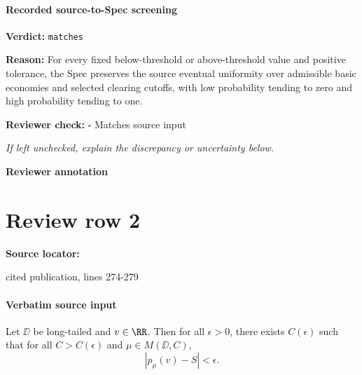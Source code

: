 \documentclass[10pt]{article}
\newcommand{\reviewerbox}{%
  \par\noindent\fbox{\parbox{0.96\linewidth}{\rule{0pt}{0.38in}}}\par
}
\newcommand{\reviewmatch}[1]{%
  \par\noindent\textbf{Reviewer check:} $\square$\; #1\par
  \noindent\emph{If left unchecked, explain the discrepancy or uncertainty below.}\par
}
\begin{document}
\paragraph{Recorded source-to-Spec screening}
\textbf{Verdict:} \texttt{matches}
\\
{\raggedright
\textbf{Reason:} For every fixed below-\allowbreak{}threshold or above-\allowbreak{}threshold value and positive tolerance, the Spec preserves the source eventual uniformity over admissible basic economies and selected clearing cutoffs, with low probability tending to zero and high probability tending to one.\allowbreak{}
\par}
\reviewmatch{Matches source input}
\noindent\textbf{Reviewer annotation}\par
\reviewerbox
\clearpage
\hypertarget{source-claim-9e706cf872adcab7}{}
\section*{Review row 2}
\textbf{Source locator:} {\footnotesize\raggedright cited publication, lines 274-\allowbreak{}279\par}
\paragraph{Verbatim source input}
\begin{ReviewVerbatim}
\begin{theorem}[Amplification]\label{thm:amplifying}
    Let $\DD$ be long-tailed and $v\in \RR$. Then for all $\epsilon > 0$, there exists $C(\epsilon)$ such that for all $C > C(\epsilon)$ and $\mu\in M(\DD, C)$,
    \begin{equation}
        |p_\mu(v) - S| < \epsilon.
    \end{equation}
\end{theorem}
\end{ReviewVerbatim}
\end{document}
